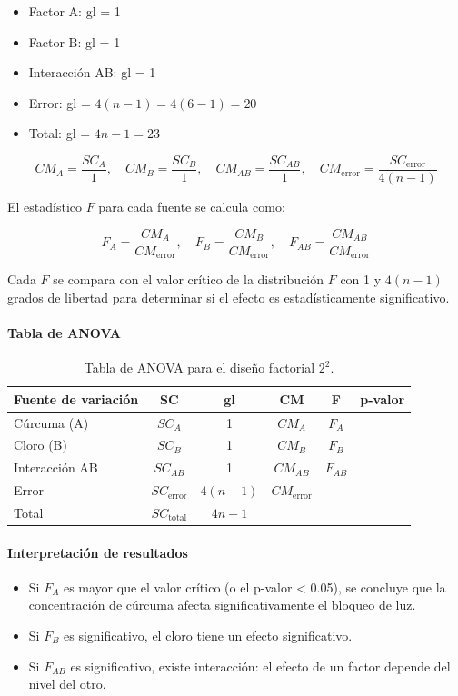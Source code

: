 \begin{itemize}
\item Factor A: gl = 1
\item Factor B: gl = 1
\item Interacción AB: gl = 1
\item Error: gl = $4(n-1) = 4(6-1) = 20$
\item Total: gl = $4n - 1 = 23$
\end{itemize}

\[
CM_A = \frac{SC_A}{1}, \quad CM_B = \frac{SC_B}{1}, \quad CM_{AB} = \frac{SC_{AB}}{1}, \quad CM_{\text{error}} = \frac{SC_{\text{error}}}{4(n-1)}
\]

El estadístico $F$ para cada fuente se calcula como:

\[
F_A = \frac{CM_A}{CM_{\text{error}}}, \quad F_B = \frac{CM_B}{CM_{\text{error}}}, \quad F_{AB} = \frac{CM_{AB}}{CM_{\text{error}}}
\]

Cada $F$ se compara con el valor crítico de la distribución $F$ con 1 y $4(n-1)$ grados de libertad para determinar si el efecto es estadísticamente significativo.

\paragraph{Tabla de ANOVA}

\begin{table}[H]
\centering
\begin{tabular}{lccccc}
\hline
Fuente de variación & SC & gl & CM & F & p-valor \\
\hline
Cúrcuma (A) & $SC_A$ & 1 & $CM_A$ & $F_A$ & \\
Cloro (B) & $SC_B$ & 1 & $CM_B$ & $F_B$ & \\
Interacción AB & $SC_{AB}$ & 1 & $CM_{AB}$ & $F_{AB}$ & \\
Error & $SC_{\text{error}}$ & $4(n-1)$ & $CM_{\text{error}}$ & & \\
\hline
Total & $SC_{\text{total}}$ & $4n-1$ & & & \\
\hline
\end{tabular}
\caption{Tabla de ANOVA para el diseño factorial $2^2$.}
\end{table}

\paragraph{Interpretación de resultados}

\begin{itemize}
\item Si $F_A$ es mayor que el valor crítico (o el p-valor < 0.05), se concluye que la concentración de cúrcuma afecta significativamente el bloqueo de luz.
\item Si $F_B$ es significativo, el cloro tiene un efecto significativo.
\item Si $F_{AB}$ es significativo, existe interacción: el efecto de un factor depende del nivel del otro.
\end{itemize}

